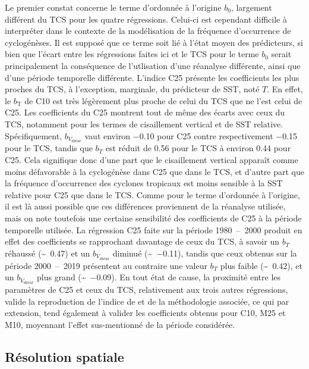 \documentclass[../main.tex]{subfiles}
\begin{document}
Le premier constat concerne le terme d'ordonnée à l'origine $b_0$, largement différent du TCS pour les quatre régressions. Celui-ci est cependant difficile à
interpréter dans le contexte de la modélisation de la fréquence d'occurrence de cyclogénèses. Il est supposé que ce terme soit lié à l'état moyen des
prédicteurs, si bien que l'écart entre les régressions faites ici et le TCS pour le terme $b_0$ serait principalement la conséquence de l'utlisation d'une
réanalyse différente, ainsi que d'une période temporelle différente. L'indice C25 présente les coefficients les plus proches du TCS, à l'exception, marginale,
du prédicteur de SST, noté $T$. En effet, le $b_{\mathrm{T}}$ de C10 est très légèrement plus proche de celui du TCS que ne l'est celui de C25. Les coefficients
du C25 montrent tout de même des écarts avec ceux du TCS, notamment pour les termes de cisaillement vertical et de SST relative. Spécifiquement,
$b_{V_{\mathrm{shear}}}$ vaut environ \num{-0.10} pour C25 contre respectivement \num{-0.15} pour le TCS, tandis que $b_T$ est réduit de \num{0.56} pour le TCS
à environ \num{0.44} pour C25. Cela signifique donc d'une part que le cisaillement vertical apparaît comme moins défavorable à la cyclogénèse dans C25 que dans
le TCS, et d'autre part que la fréquence d'occurrence des cyclones tropicaux est moins sensible à la SST relative pour C25 que dans le TCS. Comme pour le terme
d'ordonnée à l'origine, il est là aussi possible que ces différences proviennent de la réanalyse utilisée, mais on note toutefois une certaine sensibilité des
coefficients de C25 à la période temporelle utilisée. La régression C25 faite sur la période \num{1980}~--~\num{2000} produit en effet des coefficients se
rapprochant davantage de ceux du TCS, à savoir un $b_T$ réhaussé (\sim~\num{0.47}) et un $b_{V_{\mathrm{shear}}}$ diminué (\sim~\num{-0.11}), tandis que ceux
obtenus sur la période \num{2000}~--~\num{2019} présentent au contraire une valeur $b_T$ plus faible (\sim~\num{0.42}), et un $b_{V_{\mathrm{shear}}}$ plus
grand (\sim~\num{-0.09}). En tout état de cause, la proximité entre les paramètres de C25 et ceux du TCS, relativement aux trois autres régressions, valide la
reproduction de l'indice de \textcite{tippett_poisson_2011} et de la méthodologie associée, ce qui par extension, tend également à valider les coefficients
obtenus pour C10, M25 et M10, moyennant l'effet sus-mentionné de la période considérée.

\subsection{Résolution spatiale}
\end{document}
